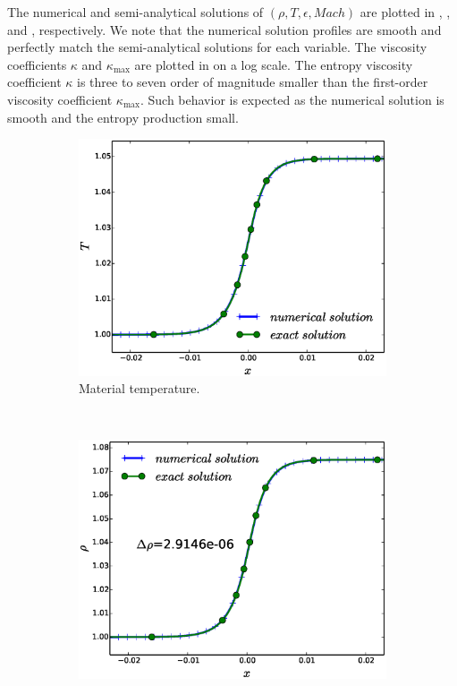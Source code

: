 \documentclass[times,doublespace]{fldauth}%
\begin{document}
The numerical and semi-analytical solutions of $(\rho, T, \epsilon, Mach)$ are plotted in , ,  and , respectively. We note that the numerical solution profiles are smooth and perfectly match the semi-analytical solutions for each variable. The viscosity coefficients $\kappa$ and $\kappa_\text{max}$ are plotted in  on a log scale. The entropy viscosity coefficient $\kappa$ is three to seven order of magnitude smaller than the first-order viscosity coefficient $\kappa_\text{max}$. Such behavior is expected as the numerical solution is smooth and the entropy production small.
%
\begin{figure}[h]
    \begin{subfigure}{0.32\textwidth}
    \centering
    \includegraphics[width=\linewidth]{figures/cst-xs/mach-1p05/mass-diff-mach-1p05-mat-temp-nel-250-plot.eps}
    \caption{Material temperature.}\label{fig:mach-1p05-cst-xs-temp}
    \end{subfigure}
    ~
    \begin{subfigure}{0.32\textwidth}
    \centering
    \includegraphics[width=\linewidth]{figures/cst-xs/mach-1p05/mass-diff-mach-1p05-density-nel-250-plot.eps}

\end{subfigure}
\end{figure}
\end{document}
